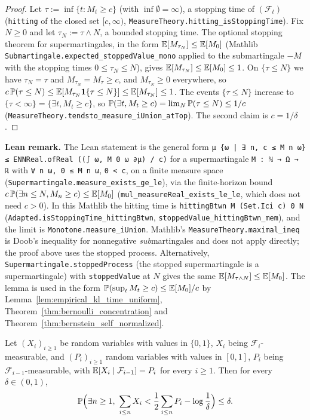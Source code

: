 \begin{proof}
\leanok
Let $\tau := \inf\{t : M_t \ge c\}$ (with $\inf \emptyset = \infty$), a stopping time of
$(\mathcal F_t)$ (\texttt{hitting} of the closed set $[c, \infty)$,
\texttt{MeasureTheory.hitting\_isStoppingTime}). Fix $N \ge 0$ and let $\tau_N := \tau \wedge N$,
a bounded stopping time. The optional stopping theorem for supermartingales, in the form
$\mathbb{E}[M_{\tau_N}] \le \mathbb{E}[M_0]$ (Mathlib \texttt{Submartingale.expected\_stoppedValue\_mono}
applied to the submartingale $-M$ with the stopping times $0 \le \tau_N \le N$), gives
$\mathbb{E}[M_{\tau_N}] \le \mathbb{E}[M_0] \le 1$. On $\{\tau \le N\}$ we have $\tau_N = \tau$ and
$M_{\tau_N} = M_\tau \ge c$, and $M_{\tau_N} \ge 0$ everywhere, so
$c\, \mathbb{P}(\tau \le N) \le \mathbb{E}[M_{\tau_N} \mathbf{1}\{\tau \le N\}] \le \mathbb{E}[M_{\tau_N}] \le 1$.
The events $\{\tau \le N\}$ increase to $\{\tau < \infty\} = \{\exists t, M_t \ge c\}$, so
$\mathbb{P}(\exists t, M_t \ge c) = \lim_N \mathbb{P}(\tau \le N) \le 1/c$
(\texttt{MeasureTheory.tendsto\_measure\_iUnion\_atTop}). The second claim is $c = 1/\delta$.
\end{proof}

\textbf{Lean remark.} The Lean statement is the general form
\texttt{μ \{ω | ∃ n, c ≤ M n ω\} ≤ ENNReal.ofReal ((∫ ω, M 0 ω ∂μ) / c)} for a supermartingale
\texttt{M : ℕ → Ω → ℝ} with \texttt{∀ n ω, 0 ≤ M n ω}, \texttt{0 < c}, on a finite measure space
(\texttt{Supermartingale.measure\_exists\_ge\_le}), via the finite-horizon bound
$c\,\mathbb{P}(\exists n \le N, M_n \ge c) \le \mathbb{E}[M_0]$ (\texttt{mul\_measureReal\_exists\_le\_le}, which does
not need $c > 0$). In this Mathlib the hitting time is \texttt{hittingBtwn M (Set.Ici c) 0 N}
(\texttt{Adapted.isStoppingTime\_hittingBtwn}, \texttt{stoppedValue\_hittingBtwn\_mem}), and the
limit is \texttt{Monotone.measure\_iUnion}. Mathlib's \texttt{MeasureTheory.maximal\_ineq} is Doob's inequality
for nonnegative \emph{sub}martingales and does not apply directly; the proof above uses the
stopped process. Alternatively, \texttt{Supermartingale.stoppedProcess} (the stopped
supermartingale is a supermartingale) with \texttt{stoppedValue} at $N$ gives the same
$\mathbb{E}[M_{\tau \wedge N}] \le \mathbb{E}[M_0]$. The lemma is used in the form
$\mathbb{P}(\sup_t M_t \ge c) \le \mathbb{E}[M_0]/c$ by Lemma~\ref{lem:empirical_kl_time_uniform},
Theorem~\ref{thm:bernoulli_concentration} and Theorem~\ref{thm:bernstein_self_normalized}.

\begin{theorem}\label{thm:bernoulli_concentration}
\leanok
Let $(X_i)_{i \ge 1}$ be random variables with values in $\{0, 1\}$, $X_i$ being
$\mathcal F_i$-measurable, and $(P_i)_{i \ge 1}$ random variables with values in $[0, 1]$, $P_i$
being $\mathcal F_{i - 1}$-measurable, with $\mathbb{E}[X_i \mid \mathcal F_{i-1}] = P_i$ for every
$i \ge 1$. Then for every $\delta \in (0, 1)$,
\[
  \mathbb{P}\Big( \exists n \ge 1,\ \sum_{i \le n} X_i < \frac12 \sum_{i \le n} P_i - \log\frac1\delta \Big) \le \delta .
\]
\end{theorem}

